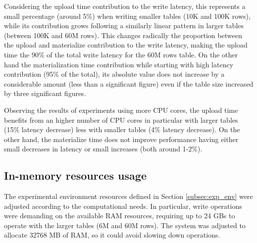 Considering the upload time contribution to the write latency, this represents a small percentage (around 5\%) when writing smaller tables (10K and 100K rows), while its contribution grows following a similarly linear pattern in larger tables (between 100K and 60M rows). This changes radically the proportion between the upload and materialize contribution to the write latency, making the upload time the 90\% of the total write latency for the 60M rows table. On the other hand the materialization time contribution while starting with high latency contribution (95\% of the total), its absolute value does not increase by a considerable amount (less than a significant figure) even if the table size increased by three significant figures.

Observing the results of experiments using more \gls{CPU} cores, the upload time benefits from an higher number of \gls{CPU} cores in particular with larger tables (15\% latency decrease) less with smaller tables (4\% latency decrease). On the other hand, the materialize time does not improve performance having either small decreases in latency or small increases (both around 1-2\%).

\subsection{In-memory resources usage}
\label{subsec:resources_usage}

The experimental environment resources defined in Section \ref{subsec:exp_env} were adjusted according to the computational needs. In particular, write operations were demanding on the available \gls{RAM} resources, requiring up to 24 GBs to operate with the larger tables (6M and 60M rows). The system was adjusted to allocate 32768 MB of \gls{RAM}, so it could avoid slowing down operations.
